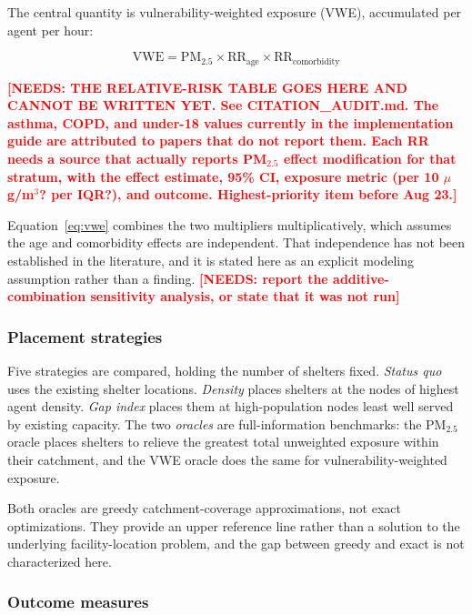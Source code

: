 \documentclass[graybox]{svmult}
\newcommand{\NEEDS}[1]{\textcolor{red}{\textbf{[NEEDS: #1]}}}
\begin{document}
The central quantity is vulnerability-weighted exposure (VWE), accumulated per
agent per hour:

\begin{equation}
\mathrm{VWE} = \mathrm{PM}_{2.5} \times \mathrm{RR}_{\mathrm{age}} \times
\mathrm{RR}_{\mathrm{comorbidity}}
\label{eq:vwe}
\end{equation}

\NEEDS{THE RELATIVE-RISK TABLE GOES HERE AND CANNOT BE WRITTEN YET. See
CITATION\_AUDIT.md. The asthma, COPD, and under-18 values currently in the
implementation guide are attributed to papers that do not report them. Each RR
needs a source that actually reports PM$_{2.5}$ effect modification for that
stratum, with the effect estimate, 95\% CI, exposure metric (per 10
$\mu$g/m$^3$? per IQR?), and outcome. Highest-priority item before Aug 23.}

Equation~\ref{eq:vwe} combines the two multipliers multiplicatively, which
assumes the age and comorbidity effects are independent. That independence has
not been established in the literature, and it is stated here as an explicit
modeling assumption rather than a finding.
\NEEDS{report the additive-combination sensitivity analysis, or state that it was
not run}

\subsubsection{Placement strategies}

Five strategies are compared, holding the number of shelters fixed. \emph{Status
quo} uses the existing shelter locations. \emph{Density} places shelters at the
nodes of highest agent density. \emph{Gap index} places them at high-population
nodes least well served by existing capacity. The two \emph{oracles} are
full-information benchmarks: the PM$_{2.5}$ oracle places shelters to relieve the
greatest total unweighted exposure within their catchment, and the VWE oracle
does the same for vulnerability-weighted exposure.

Both oracles are greedy catchment-coverage approximations, not exact
optimizations. They provide an upper reference line rather than a solution to the
underlying facility-location problem, and the gap between greedy and exact is not
characterized here.

\subsubsection{Outcome measures}
\end{document}
